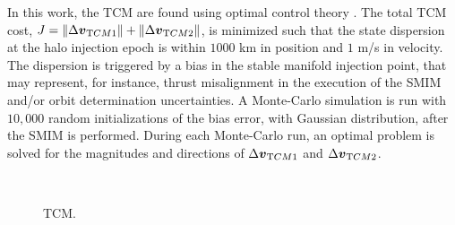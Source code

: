 \begin{figure*}[b!]
In this work, the {TCM} are found using optimal control theory \cite{serban2002haloTCM}. The total {TCM} cost, $J = \|\Delta\boldsymbol{v}_{\textrm TCM1}\|+\|\Delta\boldsymbol{v}_{\textrm TCM2}\|$, is minimized such that the state dispersion at the halo injection epoch is within $1000$ km in position and $1$ m/s in velocity. The dispersion is triggered by a bias in the stable manifold injection point, that may represent, for instance, thrust misalignment in the execution of the {SMIM} and/or orbit determination uncertainties. A Monte-Carlo simulation is run with $10,000$ random initializations of the bias error, with Gaussian distribution, after the {SMIM} is performed. During each Monte-Carlo run, an optimal problem is solved for the magnitudes and directions of $\Delta\boldsymbol{v}_{\textrm TCM1}$ and $\Delta\boldsymbol{v}_{\textrm TCM2}$.
%
\begin{figure}[t!]
	\centering
	\hfill
	\hfill
	\hfill
	\hfill
	\hfill \\
	\hfill
	\hfill
	\hfill
	\caption[Trajectory correction maneuvers.]{{TCM}.}
	\label{fig:TCMsData}
\end{figure}
%


\end{figure*}
